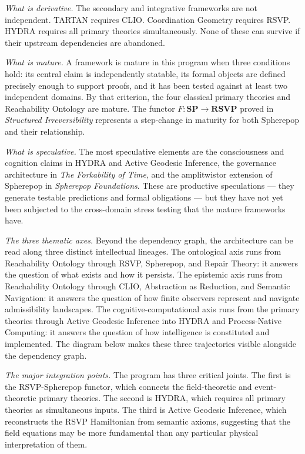 \documentclass[12pt, twoside]{article}
\begin{document}
\textit{What is derivative.} The secondary and integrative frameworks are
not independent. TARTAN requires CLIO. Coordination Geometry requires RSVP.
HYDRA requires all primary theories simultaneously. None of these can
survive if their upstream dependencies are abandoned.

\textit{What is mature.} A framework is mature in this program when three
conditions hold: its central claim is independently statable, its formal
objects are defined precisely enough to support proofs, and it has been
tested against at least two independent domains. By that criterion, the four
classical primary theories and Reachability Ontology are mature. The functor
$F: \mathbf{SP} \to \mathbf{RSVP}$ proved in \emph{Structured Irreversibility}
represents a step-change in maturity for both Spherepop and their
relationship.

\textit{What is speculative.} The most speculative elements are the
consciousness and cognition claims in HYDRA and Active Geodesic Inference,
the governance architecture in \emph{The Forkability of Time}, and the
amplitwistor extension of Spherepop in \emph{Spherepop Foundations}. These
are productive speculations — they generate testable predictions and formal
obligations — but they have not yet been subjected to the cross-domain stress
testing that the mature frameworks have.

\textit{The three thematic axes.} Beyond the dependency graph, the architecture
can be read along three distinct intellectual lineages. The ontological axis
runs from Reachability Ontology through RSVP, Spherepop, and Repair Theory:
it answers the question of what exists and how it persists. The epistemic
axis runs from Reachability Ontology through CLIO, Abstraction as Reduction,
and Semantic Navigation: it answers the question of how finite observers
represent and navigate admissibility landscapes. The cognitive-computational
axis runs from the primary theories through Active Geodesic Inference into
HYDRA and Process-Native Computing: it answers the question of how
intelligence is constituted and implemented. The diagram below makes these
three trajectories visible alongside the dependency graph.

\textit{The major integration points.} The program has three critical joints.
The first is the RSVP-Spherepop functor, which connects the field-theoretic
and event-theoretic primary theories. The second is HYDRA, which requires
all primary theories as simultaneous inputs. The third is Active Geodesic
Inference, which reconstructs the RSVP Hamiltonian from semantic axioms,
suggesting that the field equations may be more fundamental than any
particular physical interpretation of them.
\end{document}
